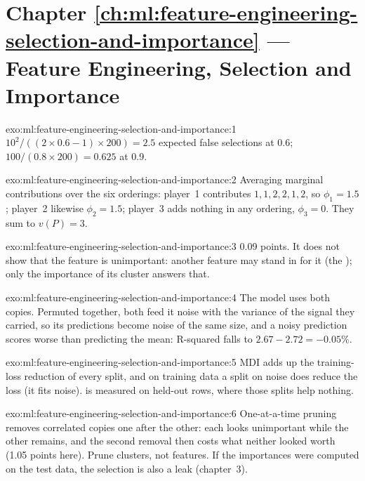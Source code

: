 \section*{Chapter \ref{ch:ml:feature-engineering-selection-and-importance} --- Feature Engineering, Selection and Importance}

\begin{solution}{exo:ml:feature-engineering-selection-and-importance:1}
$10^2/((2\times0.6 - 1)\times200) = 2.5$ expected false selections at 0.6; $100/(0.8\times200) = 0.625$ at 0.9.
\end{solution}

\begin{solution}{exo:ml:feature-engineering-selection-and-importance:2}
Averaging marginal contributions over the six orderings: player~1 contributes $1, 1, 2, 2, 1, 2$, so $\phi_1 = 1.5$;
player~2 likewise $\phi_2 = 1.5$; player~3 adds nothing in any ordering, $\phi_3 = 0$. They sum to $v(P) = 3$.
\end{solution}

\begin{solution}{exo:ml:feature-engineering-selection-and-importance:3}
0.09 points. It does not show that the feature is unimportant: another feature may stand in for it (the ); only the importance of its cluster answers that.
\end{solution}

\begin{solution}{exo:ml:feature-engineering-selection-and-importance:4}
The model uses both copies. Permuted together, both feed it noise with the variance of the signal they carried, so its
predictions become noise of the same size, and a noisy prediction scores worse than predicting the mean: R-squared falls
to $2.67 - 2.72 = -0.05\%$.
\end{solution}

\begin{solution}{exo:ml:feature-engineering-selection-and-importance:5}
MDI adds up the training-loss reduction of every split, and on training data a split on noise does reduce the loss
(it fits noise).  is measured on held-out rows, where those splits help nothing.
\end{solution}

\begin{solution}{exo:ml:feature-engineering-selection-and-importance:6}
One-at-a-time pruning removes correlated copies one after the other: each looks unimportant while the other remains, and
the second removal then costs what neither looked worth (1.05 points here). Prune clusters, not features. If the
importances were computed on the test data, the selection is also a leak (chapter~3).
\end{solution}

